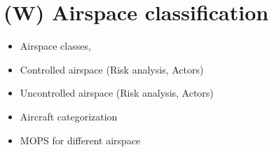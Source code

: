 \section{(W) Airspace classification}\label{sec:AirspaceClassification}
\begin{itemize}
    \item Airspace classes,
    \item Controlled airspace (Risk analysis, Actors)
    \item Uncontrolled airspace (Risk analysis, Actors)
    \item Aircraft categorization
    \item MOPS for different airspace 
\end{itemize}